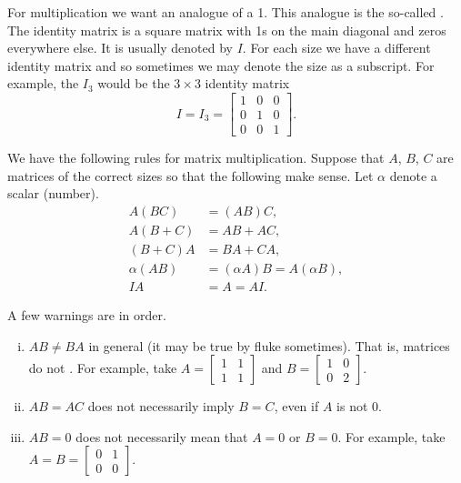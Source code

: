 \medskip

For multiplication we want an analogue of a 1.  This analogue is the
so-called \emph{}.
The identity matrix is a square matrix with 1s on the
main diagonal and zeros everywhere else.  It is usually denoted by $I$.
For each size we have a different identity matrix and so sometimes we may denote
the size as a subscript.  For example, the $I_3$ would be the $3 \times 3$
identity matrix
\begin{equation*}
I = I_3 =
\begin{bmatrix}
1 & 0 & 0 \\
0 & 1 & 0 \\
0 & 0 & 1
\end{bmatrix} .
\end{equation*}

We have the following rules for matrix multiplication.  Suppose that
$A$, $B$, $C$ are matrices of the correct sizes so that the following
make sense.  Let $\alpha$ denote a scalar (number).
\begin{align*}
A(BC) & = (AB)C, \\
A(B+C) & = AB + AC, \\
(B+C)A & = BA + CA, \\
\alpha(AB) & = (\alpha A)B = A(\alpha B), \\
IA & = A = AI .
\end{align*}

A few warnings are in order.
\begin{enumerate}[(i)]
\item $AB \not= BA$ in general (it may be true by fluke sometimes).  That is,
matrices do not .
For example, take
$A = \left[ \begin{smallmatrix} 1 & 1 \\ 1 & 1 \end{smallmatrix} \right]$
and
$B = \left[ \begin{smallmatrix} 1 & 0 \\ 0 & 2 \end{smallmatrix} \right]$.
\item $AB = AC$ does not necessarily imply $B=C$, even if $A$ is not 0.
\item $AB = 0$ does not necessarily mean that $A=0$ or $B=0$.
For example, take
$A = B = \left[ \begin{smallmatrix} 0 & 1 \\ 0 & 0 \end{smallmatrix}
\right]$.
\end{enumerate}

